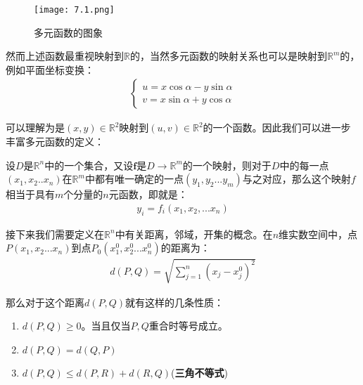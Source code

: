 \documentclass{ctexart}
\let\oldtextbf\textbf %
\renewcommand{\textbf}[1]{\textcolor{btex}{\oldtextbf{#1}}} %
\begin{document}
\begin{figure}[H]    
\centering     
\renewcommand{\figurename}{图}     
\renewcommand{\thefigure}{7.1}    
\begin{myimagebox}[width=0.5\textwidth] %
\texttt{[image: 7.1.png]} %
\end{myimagebox}     
\caption{\label{fig:7.1}多元函数的图象}   
\end{figure}

然而上述函数最重视映射到$\mathbb{R}$的，当然多元函数的映射关系也可以是映射到$\mathbb{R}^m$的，例如平面坐标变换：
\begin{align*}
    \begin{cases}
u=x\cos\alpha-y\sin\alpha\\
v=x\sin\alpha+y\cos\alpha
    \end{cases}
\end{align*}

可以理解为是$(x,y)\in\mathbb{R}^2$映射到$(u,v)\in\mathbb{R}^2$的一个函数。因此我们可以进一步丰富多元函数的定义：

\begin{tcolorbox}[
    colback=bac2,     %
    colframe=fra2,   %
    coltitle=white,             %
    coltext=tex2,
    title=多元函数的定义,
    fonttitle=\bfseries,        %
arc=3mm,                     %
breakable
]
设$D$是$\mathbb{R}^n$中的一个集合，又设$\bm{f}$是$D\to\mathbb{R}^m$的一个映射，则对于$D$中的每一点$(x_1,x_2..x_n)$在$\mathbb{R}^m$中都有唯一确定的一点$(y_1,y_2...y_m)$与之对应，那么这个映射$f$相当于具有$m$个分量的$n$元函数，即就是：
\begin{align*}
    y_i=f_i(x_1,x_2,...x_n)
\end{align*}
\end{tcolorbox}

接下来我们需要定义在$\mathbb{R}^n$中有关距离，邻域，开集的概念。在$n$维实数空间中，点$P(x_1,x_2...x_n)$到点$P_0(x_1^0,x_2^0...x_n^0)$的距离为：
\begin{align*}
    d(P,Q)=\sqrt{\sum_{j=1}^n(x_j-x_j^0)^2}\tag{7-1}
\end{align*}

那么对于这个距离$d(P,Q)$就有这样的几条性质：

\begin{enumerate}
    \item $d(P,Q)\geq 0$。当且仅当$P,Q$重合时等号成立。
    \item $d(P,Q)=d(Q,P)$
    \item $d(P,Q)\leq d(P,R)+d(R,Q)$(\textbf{三角不等式})
\end{enumerate}
\end{document}
